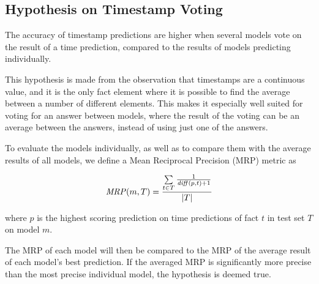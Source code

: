 \subsection{Hypothesis on Timestamp Voting}
\label{sec:hypothesis_timestamp_voting}

\begin{hypothesis}
\label{hyp:timestamp_voting}
The accuracy of timestamp predictions are higher when several models vote on the result of a time prediction, compared to the results of models predicting individually.
\end{hypothesis}

This hypothesis is made from the observation that timestamps are a continuous value, and it is the only fact element where it is possible to find the average between a number of different elements. This makes it especially well suited for voting for an answer between models, where the result of the voting can be an average between the answers, instead of using just one of the answers.

To evaluate the models individually, as well as to compare them with the average results of all models, we define a Mean Reciprocal Precision (MRP) metric as

\begin{equation}
\begin{gathered}
\mathit{MRP}(m, T) = \frac{\sum\limits_{t \in T} \frac{1}{\mathit{diff}(p, t) + 1}}{|T|}
\end{gathered}
\end{equation}

\noindent
where $p$ is the highest scoring prediction on time predictions of fact $t$ in test set $T$ on model $m$.

The MRP of each model will then be compared to the MRP of the average result of each model's best prediction. If the averaged MRP is significantly more precise than the most precise individual model, the hypothesis is deemed true.




